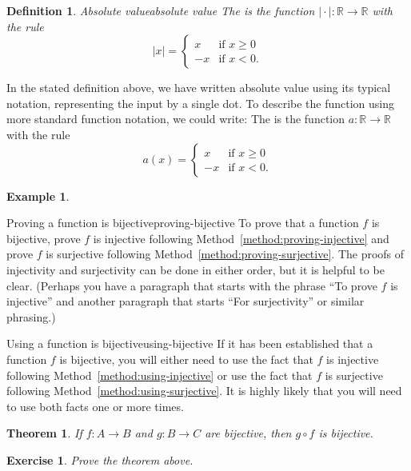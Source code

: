 \documentclass{book}
\newcounter{ekcounter}%
\theoremstyle{ekimcustom}
\newtheorem{theorem}[ekcounter]{Theorem}
\newtheorem{example}[ekcounter]{Example}
\newtheorem{exercise}[ekcounter]{Exercise}
\newtheorem{definition}[ekcounter]{Definition}
\newcommand\defn[1]{{\color{blue}{\bf #1}}}
\begin{document}
\begin{definition}{Absolute value}{absolute value}
The \defn{absolute value function} is the function $\mid \cdot \mid : \mathbb{R} \to \mathbb{R}$ with the rule
\[ |x| = \left\{ \begin{array}{ll} x &\text{if }x \geq 0\\-x &\text{if } x < 0.\end{array}\right.\]
\end{definition}
In the stated definition above, we have written absolute value using its typical notation, representing the input by a single dot. To describe the function using more standard function notation, we could write: The \defn{absolute value function} is the function $a : \mathbb{R} \to \mathbb{R}$ with the rule
\[ a(x) = \left\{ \begin{array}{ll} x &\text{if }x \geq 0\\-x &\text{if } x < 0.\end{array}\right.\]
\begin{example}

\end{example}

\begin{bmethod}{Proving a function is bijective}{proving-bijective}
To prove that a function $f$ is bijective, prove $f$ is injective following Method~\ref{method:proving-injective} and prove $f$ is surjective following Method~\ref{method:proving-surjective}. The proofs of injectivity and surjectivity can be done in either order, but it is helpful to be clear. (Perhaps you have a paragraph that starts with the phrase ``To prove $f$ is injective'' and another paragraph that starts ``For surjectivity'' or similar phrasing.)
\end{bmethod}
\begin{bmethod}{Using a function is bijective}{using-bijective}
If it has been established that a function $f$ is bijective, you will either need to use the fact that $f$ is injective following Method~\ref{method:using-injective} or use the fact that $f$ is surjective following Method~\ref{method:using-surjective}. It is highly likely that you will need to use both facts one or more times.
\end{bmethod}
\begin{theorem}
If $f : A \to B$ and $g: B \to C$ are bijective, then $g \circ f$ is bijective.
\end{theorem}
\begin{exercise}
Prove the theorem above.
\end{exercise}
\end{document}

